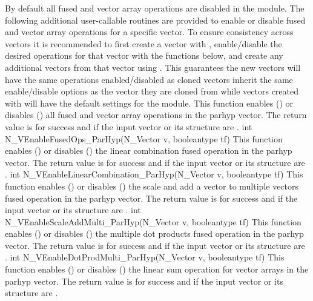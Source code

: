 By default all fused and vector array operations are disabled in the {\nvecph}
module. The following additional user-callable routines are provided to
enable or disable fused and vector array operations for a specific vector. To
ensure consistency across vectors it is recommended to first create a vector
with , enable/disable the desired operations for that vector
with the functions below, and create any additional vectors from that vector
using . This guarantees the new vectors will have the same
operations enabled/disabled as cloned vectors inherit the same enable/disable
options as the vector they are cloned from while vectors created with
 will have the default settings for the {\nvecph} module.
{
  This function enables () or disables () all fused and
  vector array operations in the parhyp vector. The return value is  for
  success and  if the input vector or its  structure are .
}
{
  int N\_VEnableFusedOps\_ParHyp(N\_Vector v, booleantype tf)
}
{
  This function enables () or disables () the linear
  combination fused operation in the parhyp vector. The return value is  for
  success and  if the input vector or its  structure are .
}
{
  int N\_VEnableLinearCombination\_ParHyp(N\_Vector v, booleantype tf)
}
{
  This function enables () or disables () the scale and
  add a vector to multiple vectors fused operation in the parhyp vector. The
  return value is  for success and  if the input vector or its
   structure are .
}
{
  int N\_VEnableScaleAddMulti\_ParHyp(N\_Vector v, booleantype tf)
}
{
  This function enables () or disables () the multiple
  dot products fused operation in the parhyp vector. The return value is 
  for success and  if the input vector or its  structure are
  .
}
{
  int N\_VEnableDotProdMulti\_ParHyp(N\_Vector v, booleantype tf)
}
{
  This function enables () or disables () the linear sum
  operation for vector arrays in the parhyp vector. The return value is  for
  success and  if the input vector or its  structure are .
}
